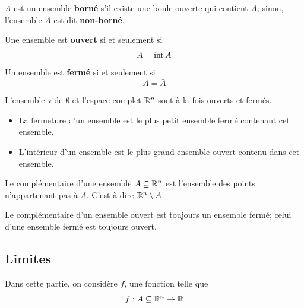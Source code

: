 \begin{mydef}
	$A$ est un ensemble \textbf{borné} s'il existe une boule ouverte qui contient $A$;
	sinon, l'ensemble $A$ est dit \textbf{non-borné}.
\end{mydef}

\begin{mydef}
	Une ensemble est \textbf{ouvert} si et seulement si
	\[ A = \operatorname{int} A \]
	Un ensemble est \textbf{fermé} si et seulement si
	\[ A = \bar{A} \]
\end{mydef}

\begin{myprop}
	L'ensemble vide $\emptyset$ et l'espace complet $\mathbb{R}^n$ sont à la fois ouverts et fermés.
\end{myprop}

\begin{myprop}\InsertTheoremBreak
	\begin{itemize}
		\item La fermeture d'un ensemble est le plus petit ensemble fermé contenant cet ensemble,
		\item L'intérieur d'un ensemble est le plus grand ensemble ouvert contenu dans cet ensemble.
	\end{itemize}
\end{myprop}

\begin{mydef}
	Le complémentaire d'une ensemble $A \subseteq \mathbb{R}^n$ est l'ensemble des points n'appartenant pas à $A$.
	C'est à dire $\mathbb{R}^n \setminus A$.
\end{mydef}

\begin{mytheo}
	Le complémentaire d'un ensemble ouvert est toujours un ensemble fermé;
	celui d'une ensemble fermé est toujours ouvert.
\end{mytheo}

\subsection{Limites}

Dans cette partie, on considère $f$, une fonction telle que
\[ f : A \subseteq \mathbb{R}^n \to \mathbb{R} \]

